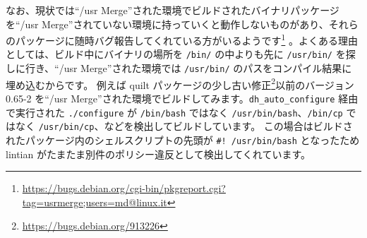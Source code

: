 \documentclass[mingoth,a4paper]{jsarticle}
\begin{document}
なお、現状では``/usr Merge''された環境でビルドされたバイナリパッケージを``/usr Merge''されていない環境に持っていくと動作しないものがあり、それらのパッケージに随時バグ報告してくれている方がいるようです\footnote{\url{https://bugs.debian.org/cgi-bin/pkgreport.cgi?tag=usrmerge;users=md@linux.it}}
。よくある理由としては、ビルド中にバイナリの場所を \verb|/bin/| の中よりも先に \verb|/usr/bin/| を探しに行き、``/usr Merge''された環境では \verb|/usr/bin/| のパスをコンパイル結果に埋め込むからです。
例えば quilt パッケージの少し古い修正\footnote{\url{https://bugs.debian.org/913226}}以前のバージョン 0.65-2 を``/usr Merge''された環境でビルドしてみます。\verb|dh_auto_configure| 経由で実行された \verb|./configure| が \verb|/bin/bash| ではなく \verb|/usr/bin/bash|、\verb|/bin/cp| ではなく \verb|/usr/bin/cp|、などを検出してビルドしています。
この場合はビルドされたパッケージ内のシェルスクリプトの先頭が \verb|#! /usr/bin/bash| となったため lintian がたまたま別件のポリシー違反として検出してくれています。
\end{document}
